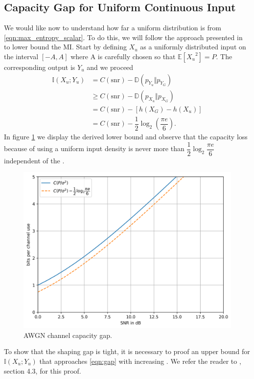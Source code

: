 \subsection{Capacity Gap for Uniform Continuous Input}
We would like now to understand how far a uniform distribution is from \ref{eqn:max_entropy_scalar}. To do this, we will follow the approach presented in \cite{Boecherer_CM} to lower bound the MI. Start by defining $X_u$ as a uniformly distributed input on the interval $[-A, A]$ where A is carefully chosen so that $\mathbb{E}[{X_u}^2] = P$. The corresponding output is $Y_u$ and we proceed
\begin{align}
	\mathbb{I}(X_u;Y_u) &= C(\text{snr}) - \mathbb{D}(p_{Y_u} \Vert p_{Y_G})\\
	& \geq C(\text{snr}) - \mathbb{D}(p_{X_u} \Vert p_{X_G})\\
	& = C(\text{snr}) -[h(X_G) - h(X_u)]\\
	& = C(\text{snr}) - \dfrac{1}{2} \log_{2} \left(\dfrac{\pi e}{6}\right).
	\label{eqn:gap}
\end{align}
In figure \ref{fig:capacity_gap} we display the derived lower bound and observe that the capacity loss because of using a uniform input density is never more than $\dfrac{1}{2}\log_2\dfrac{\pi e}{6}$ independent of the .
\begin{figure}
	\includegraphics[width=\textwidth]{figs/capacity_gap.png}
	\caption{AWGN channel capacity gap.}
    \label{fig:capacity_gap}
\end{figure}
To show that the shaping gap is tight, it is necessary to proof an upper bound for $\mathbb{I}(X_u;Y_u)$ that approaches \ref{eqn:gap} with increasing . We refer the reader to \cite{Boecherer_CM}, section 4.3, for this proof.
